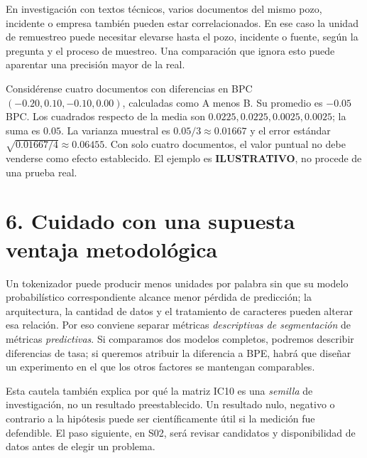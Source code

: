 En investigación con textos técnicos, varios documentos del mismo pozo,
incidente o empresa también pueden estar correlacionados. En ese caso la
unidad de remuestreo puede necesitar elevarse hasta el pozo, incidente o
fuente, según la pregunta y el proceso de muestreo. Una comparación que
ignora esto puede aparentar una precisión mayor de la real.

\begin{ejemplo}
Considérense cuatro documentos con diferencias en BPC
$(-0.20,0.10,-0.10,0.00)$, calculadas como A menos B.
Su promedio es $-0.05$ BPC. Los cuadrados respecto de la media son
$0.0225,0.0225,0.0025,0.0025$; la suma es $0.05$.
La varianza muestral es $0.05/3\approx0.01667$ y el error estándar
$\sqrt{0.01667/4}\approx0.06455$. Con solo cuatro documentos,
el valor puntual no debe venderse como efecto establecido. El ejemplo es
\textbf{ILUSTRATIVO}, no procede de una prueba real.
\end{ejemplo}

\section*{6. Cuidado con una supuesta ventaja metodológica}
Un tokenizador puede producir menos unidades por palabra sin que
su modelo probabilístico correspondiente alcance menor pérdida de
predicción; la arquitectura, la cantidad de datos y el tratamiento
de caracteres pueden alterar esa relación. Por eso conviene separar
métricas \emph{descriptivas de segmentación} de métricas \emph{predictivas}.
Si comparamos dos modelos completos, podremos describir diferencias
de tasa; si queremos atribuir la diferencia a BPE, habrá que diseñar un
experimento en el que los otros factores se mantengan comparables.

Esta cautela también explica por qué la matriz IC10 es una \emph{semilla}
de investigación, no un resultado preestablecido. Un resultado nulo,
negativo o contrario a la hipótesis puede ser científicamente útil si
la medición fue defendible. El paso siguiente, en S02, será revisar
candidatos y disponibilidad de datos antes de elegir un problema.
